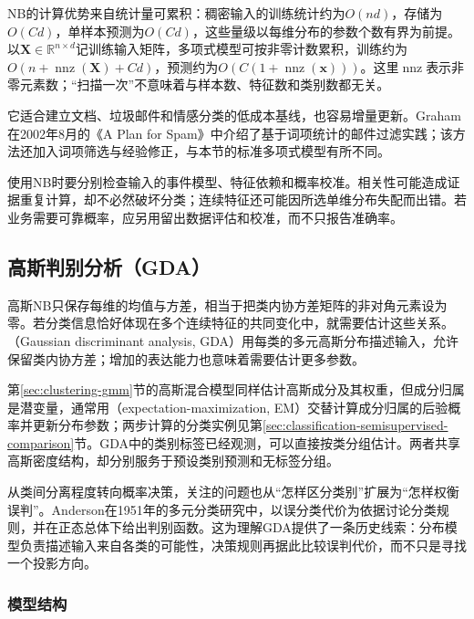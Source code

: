 NB的计算优势来自统计量可累积：稠密输入的训练统计约为$O(nd)$，存储为$O(Cd)$，单样本预测为$O(Cd)$，这些量级以每维分布的参数个数有界为前提。以$\bm{X}\in\mathbb{R}^{n\times d}$记训练输入矩阵，多项式模型可按非零计数累积，训练约为$O(n+\operatorname{nnz}(\bm{X})+Cd)$，预测约为$O(C(1+\operatorname{nnz}(\bm{x})))$。这里$\operatorname{nnz}$表示非零元素数；“扫描一次”不意味着与样本数、特征数和类别数都无关。

它适合建立文档、垃圾邮件和情感分类的低成本基线，也容易增量更新。Graham在2002年8月的《A Plan for Spam》中介绍了基于词项统计的邮件过滤实践；该方法还加入词项筛选与经验修正，与本节的标准多项式模型有所不同。

使用NB时要分别检查输入的事件模型、特征依赖和概率校准。相关性可能造成证据重复计算，却不必然破坏分类；连续特征还可能因所选单维分布失配而出错。若业务需要可靠概率，应另用留出数据评估和校准，而不只报告准确率。

\subsection{高斯判别分析（GDA）}
\label{sec:classification-gda}

高斯NB只保存每维的均值与方差，相当于把类内协方差矩阵的非对角元素设为零。若分类信息恰好体现在多个连续特征的共同变化中，就需要估计这些关系。（Gaussian discriminant analysis, GDA）用每类的多元高斯分布描述输入，允许保留类内协方差；增加的表达能力也意味着需要估计更多参数。

第\ref{sec:clustering-gmm}节的高斯混合模型同样估计高斯成分及其权重，但成分归属是潜变量，通常用（expectation-maximization, EM）交替计算成分归属的后验概率并更新分布参数；两步计算的分类实例见第\ref{sec:classification-semisupervised-comparison}节。GDA中的类别标签已经观测，可以直接按类分组估计。两者共享高斯密度结构，却分别服务于预设类别预测和无标签分组。

从类间分离程度转向概率决策，关注的问题也从“怎样区分类别”扩展为“怎样权衡误判”。Anderson在1951年的多元分类研究中，以误分类代价为依据讨论分类规则，并在正态总体下给出判别函数。这为理解GDA提供了一条历史线索：分布模型负责描述输入来自各类的可能性，决策规则再据此比较误判代价，而不只是寻找一个投影方向。

\subsubsection{模型结构}
\label{sec:classification-gda-structure}


